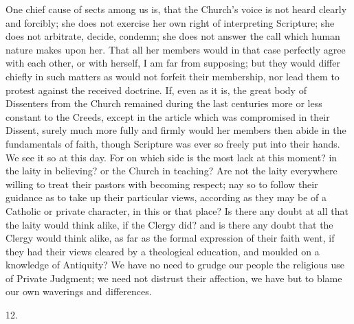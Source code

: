 One chief cause of sects among us is, that the Church's voice is
not heard clearly and forcibly; she does not exercise her own right of
interpreting Scripture; she does not arbitrate, decide, condemn; she
does not answer the call which human nature makes upon her. That all
her members would in that case perfectly agree with each other, or
with herself, I am far from supposing; but they would differ chiefly
in such matters as would not forfeit their membership, nor lead them
to protest against the received doctrine. If, even as it is, the great
body of Dissenters from the Church remained during the last centuries
more or less constant to the Creeds, except in the article which was
compromised in their Dissent, surely much more fully and firmly would
her members then abide in the fundamentals of faith, though Scripture
was ever so freely put into their hands. We see it so at this day. For
on which side is the most lack at this moment? in the laity in
believing? or the Church in teaching? Are not the laity everywhere
willing to treat their pastors with becoming respect; nay so to follow
their guidance as to take up their particular views, according as they
may be of a Catholic or private character, in this or that place? Is
there any doubt at all that the laity would think alike, if the Clergy
did? and is there any doubt that the Clergy would think alike, as far
as the formal expression of their faith went, if they had their views
cleared by a theological education, and moulded on a knowledge of
Antiquity? We have no need to grudge our people the religious use
of Private Judgment; we need not distrust their affection, we
have but to blame our own waverings and differences.

12.

